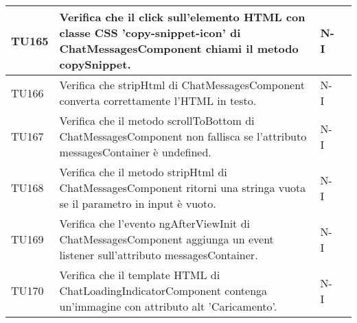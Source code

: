 \begin{table}[h!]
\begin{tabularx}{\textwidth}{|p{}|X|p{}|p{}|}
    TU165 & Verifica che il click sull'elemento HTML con classe CSS 'copy-snippet-icon' di ChatMessagesComponent chiami il metodo copySnippet. &  N-I \\ \hline
    TU166 & Verifica che stripHtml di ChatMessagesComponent converta correttamente l'HTML in testo. &  N-I \\ \hline
    TU167 & Verifica che il metodo scrollToBottom di ChatMessagesComponent non fallisca se l'attributo messagesContainer è undefined. &  N-I \\ \hline
    TU168 & Verifica che il metodo stripHtml di ChatMessagesComponent ritorni una stringa vuota se il parametro in input è vuoto. &  N-I \\ \hline
    TU169 & Verifica che l'evento ngAfterViewInit di ChatMessagesComponent aggiunga un event listener sull'attributo messagesContainer. &  N-I \\ \hline
    TU170 & Verifica che il template HTML di ChatLoadingIndicatorComponent contenga un'immagine con attributo alt 'Caricamento'. &  N-I \\ \hline

    \end{tabularx}
\end{table}

\newpage

